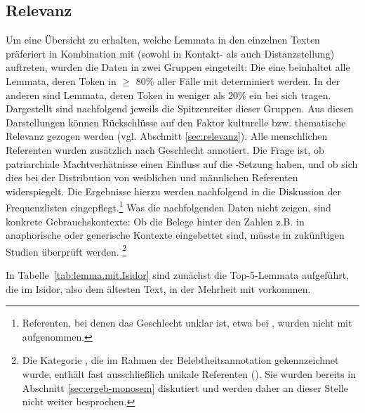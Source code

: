 \subsection{Relevanz}\label{sec:ergeb-relevanz}

Um eine Übersicht zu erhalten, welche Lemmata in den einzelnen Texten präferiert in Kombination mit  (sowohl in Kontakt- als auch Distanzstellung) auftreten, wurden die Daten in zwei Gruppen eingeteilt: Die eine beinhaltet alle Lemmata, deren Token in $\geq$ 80\% aller Fälle  mit  determiniert werden. In der anderen sind Lemmata, deren Token in weniger als 20\%  ein  bei sich tragen. Dargestellt sind nachfolgend jeweils die Spitzenreiter dieser Gruppen. Aus diesen Darstellungen können Rückschlüsse auf den Faktor kulturelle bzw. thematische Relevanz gezogen werden (vgl. Abschnitt \ref{sec:relevanz}). Alle menschlichen Referenten wurden zusätzlich nach Geschlecht annotiert. Die Frage ist, ob patriarchiale Machtverhätnisse  einen Einfluss auf die -Setzung haben, und ob sich dies bei der Distribution von weiblichen und männlichen Referenten widerspiegelt. Die Ergebnisse hierzu werden nachfolgend in die Diskussion der Frequenzlisten eingepflegt.\footnote{Referenten, bei denen das Geschlecht unklar ist, etwa bei , wurden nicht mit aufgenommen.} Was die nachfolgenden Daten nicht zeigen, sind konkrete Gebrauchskontexte: Ob die Belege hinter den Zahlen z.B. in anaphorische oder generische Kontexte eingebettet sind, müsste in zukünftigen Studien überprüft werden. \footnote{Die Kategorie , die im Rahmen der Belebtheitsannotation gekennzeichnet wurde, enthält fast ausschließlich unikale Referenten (). Sie wurden bereits in Abschnitt \ref{sec:ergeb-monosem} diskutiert und werden daher an dieser Stelle nicht weiter besprochen.} 

In Tabelle~\ref {tab:lemma.mit.Isidor} sind zunächst die Top-5-Lemmata aufgeführt, die im Isidor, also dem ältesten Text, in der Mehrheit mit  vorkommen. 


